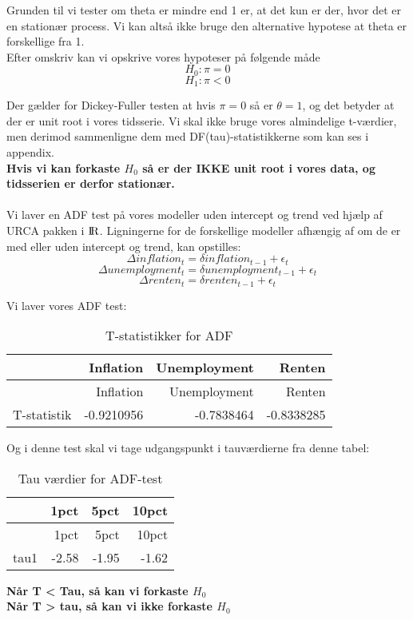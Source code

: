 \documentclass[
  10pt,
]{article}
\begin{document}
Grunden til vi tester om theta er mindre end 1 er, at det kun er der,
hvor det er en stationær process. Vi kan altså ikke bruge den
alternative hypotese at theta er forskellige fra 1.\\
Efter omskriv kan vi opskrive vores hypoteser på følgende måde\\
\[ H_0: \pi = 0 \tag{Unit root}  \]
\[H_1: \pi < 0 \tag{No unit root}  \]

Der gælder for Dickey-Fuller testen at hvis \(\pi = 0\) så er
\(\theta = 1\), og det betyder at der er unit root i vores tidsserie. Vi
skal ikke bruge vores almindelige t-værdier, men derimod sammenligne dem
med DF(tau)-statistikkerne som kan ses i appendix.\\

\textbf{Hvis vi kan forkaste $H_0$ så er der IKKE unit root i vores data, og tidsserien er derfor stationær.}\\
~\\
Vi laver en ADF test på vores modeller uden intercept og trend ved hjælp
af URCA pakken i \({\rm I\!R}\). Ligningerne for de forskellige modeller
afhængig af om de er med eller uden intercept og trend, kan opstilles:
\[\Delta inflation_t = \delta inflation_{t-1}  + \epsilon_t \tag{No intercept, no trend}  \]
\[\Delta unemployment_t = \delta unemployment_{t-1}  + \epsilon_t \tag{No intercept, no trend}  \]
\[\Delta renten_t = \delta renten_{t-1}  + \epsilon_t \tag{No intercept, no trend}  \]

Vi laver vores ADF test:

\begin{longtable}[]{@{}lrrr@{}}
\caption{T-statistikker for ADF}\tabularnewline
\toprule
& Inflation & Unemployment & Renten\tabularnewline
\midrule
\endfirsthead
\toprule
& Inflation & Unemployment & Renten\tabularnewline
\midrule
\endhead
T-statistik & -0.9210956 & -0.7838464 & -0.8338285\tabularnewline
\bottomrule
\end{longtable}

Og i denne test skal vi tage udgangspunkt i tauværdierne fra denne
tabel:

\begin{longtable}[]{@{}lrrr@{}}
\caption{Tau værdier for ADF-test}\tabularnewline
\toprule
& 1pct & 5pct & 10pct\tabularnewline
\midrule
\endfirsthead
\toprule
& 1pct & 5pct & 10pct\tabularnewline
\midrule
\endhead
tau1 & -2.58 & -1.95 & -1.62\tabularnewline
\bottomrule
\end{longtable}

\textbf{Når T < Tau, så kan vi forkaste $H_0$}\\
\textbf{Når T > tau, så kan vi ikke forkaste $H_0$}\\
\end{document}
